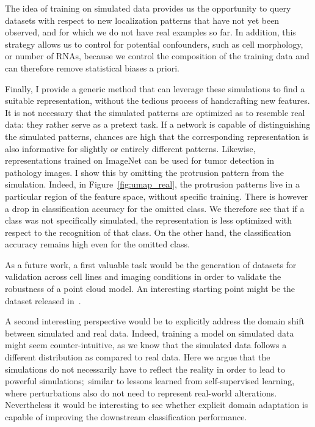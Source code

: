 The idea of training on simulated data provides us the opportunity to query datasets with respect to new localization patterns that have not yet been observed, and for which we do not have real examples so far.
In addition, this strategy allows us to control for potential confounders, such as cell morphology, or number of \ac{RNA}s, because we control the composition of the training data and can therefore remove statistical biases a priori.

Finally, I provide a generic method that can leverage these simulations to find a suitable representation, without the tedious process of handcrafting new features.
It is not necessary that the simulated patterns are optimized as to resemble real data: they rather serve as a pretext task.
If a network is capable of distinguishing the simulated patterns, chances are high that the corresponding representation is also informative for slightly or entirely different patterns.
Likewise, representations trained on ImageNet can be used for tumor detection in pathology images.
I show this by omitting the protrusion pattern from the simulation.
Indeed, in Figure~\ref{fig:umap_real}, the protrusion patterns live in a particular region of the feature space, without specific training.
There is however a drop in classification accuracy for the omitted class.
We therefore see that if a class was not specifically simulated, the representation is less optimized with respect to the recognition of that class.
On the other hand, the classification accuracy remains high even for the omitted class.

As a future work, a first valuable task would be the generation of datasets for validation across cell lines and imaging conditions in order to validate the robustness of a point cloud model.
An interesting starting point might be the dataset released in~\cite{savulescu_interrogating_2021, mah_bento_2022}.

A second interesting perspective would be to explicitly address the domain shift between simulated and real data.
Indeed, training a model on simulated data might seem counter-intuitive, as we know that the simulated data follows a different distribution as compared to real data.
Here we argue that the simulations do not necessarily have to reflect the reality in order to lead to powerful simulations;~similar to lessons learned from self-supervised learning, where perturbations also do not need to represent real-world alterations.
Nevertheless it would be interesting to see whether explicit domain adaptation is capable of improving the downstream classification performance.

